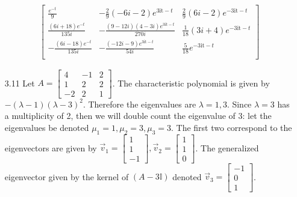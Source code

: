 \documentclass[12pt, letterpaper]{article}
\begin{document}
\begin{enumerate}
\begin{align*}
\begin{bmatrix}
 \frac{e^{-t}}{9} & -\frac{2}{9} (-6 i-2) e^{3 \text{it}-t} &
   \frac{2}{9} (6 i-2) e^{-3 \text{it}-t} \\
 \frac{(6 i+18) e^{-t}}{135 i} & -\frac{(9-12 i) (4-3 i) e^{3
   \text{it}-t}}{270 i} & \frac{1}{18} (3 i+4) e^{-3 \text{it}-t}
   \\
 -\frac{(6 i-18) e^{-t}}{135 i} & -\frac{(-12 i-9) e^{3
   \text{it}-t}}{54 i} & \frac{5}{18} e^{-3 \text{it}-t} \\
\end{bmatrix}			
		\end{align*}
		
		\item[3.11]
		Let $A = \begin{bmatrix}
		4 & -1 & 2\\
		1 & 2 &2\\
		-2 & 2 & 1
\end{bmatrix}$.  The characteristic polynomial is given by $-(\lambda - 1)(\lambda - 3)^2$.  Therefore the eigenvalues are $\lambda = 1,3$.  Since $\lambda = 3$ has a multiplicity of 2, then we will double count the eigenvalue of $3$: let the eigenvalues be denoted $\mu_1 = 1, \mu_2 = 3, \mu_3 = 3$.  The first two correspond to the eigenvectors are given by $\Vec{v}_1 = \begin{bmatrix} 1 \\ 1 \\ -1 \end{bmatrix} , \Vec{v}_2 = \begin{bmatrix}
1 \\ 1 \\ 0
\end{bmatrix} $. The generalized eigenvector given by the kernel of $(A-3 \mathbb{I})$ denoted $\Vec{v}_3 = \begin{bmatrix}
-1 \\ 0 \\ 1
\end{bmatrix} $.


\end{enumerate}
\end{document}
